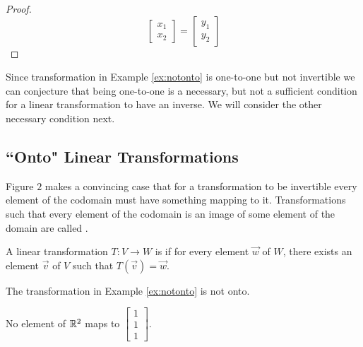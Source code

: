 \documentclass{ximera}
\begin{document}
\begin{example}
\begin{proof}
$$\begin{bmatrix}x_1\\x_2\end{bmatrix}=\begin{bmatrix}y_1\\y_2\end{bmatrix}$$
\end{proof}
\end{example}

Since transformation in Example \ref{ex:notonto} is one-to-one but not invertible we can conjecture that being one-to-one is a necessary, but not a sufficient condition for a linear transformation to have an inverse.  We will consider the other necessary condition next.

\subsection*{``Onto" Linear Transformations}
Figure $2$ makes a convincing case that for a transformation to be invertible every element of the codomain must have something mapping to it. Transformations such that every element of the codomain is an image of some element of the domain are called .
\begin{definition}[Onto]\label{def:onto} A linear transformation $T:V\rightarrow W$ is  if for every element $\vec{w}$ of $W$, there exists an element $\vec{v}$ of $V$ such that $T(\vec{v})=\vec{w}$.
\end{definition}

\begin{example}\label{ex:notonto2}
The transformation in Example \ref{ex:notonto} is not onto.
\begin{explanation}
No element of $\mathbb{R}^2$ maps to $\begin{bmatrix}1\\1\\1\end{bmatrix}$.
\end{explanation}
\end{example}
\end{document}

